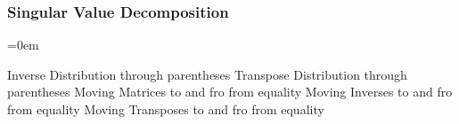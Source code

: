 \subsubsection{Singular Value Decomposition}
\label{sssec:singular_value_decomposition}
\parindent=0em



\subsubsectionend


\subsectionend

Inverse Distribution through parentheses
Transpose Distribution through parentheses
Moving Matrices to and fro from equality
Moving Inverses to and fro from equality
Moving Transposes to and fro from equality

\sectionend
